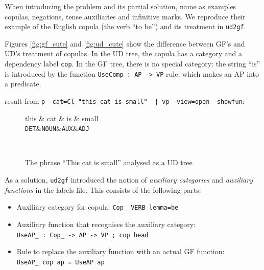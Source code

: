 When introducing the problem and its partial solution, \cite{kolachina-ranta-2017} name as examples copulas, negations, tense auxiliaries and infinitive marks. We reproduce their example of the English copula (the verb ``to be'') and its treatment in \verb|ud2gf|.

Figures \ref{fig:gf_cute} and \ref{fig:ud_cute} show the difference between GF's and UD's treatment of copulas. In the UD tree, the copula has a category and a dependency label \verb|cop|. In the GF tree, there is no special category: the string ``is'' is introduced by the function \verb|UseComp : AP -> VP| rule, which makes an AP into a predicate.


result from \verb+p -cat=Cl "this cat is small"  | vp -view=open -showfun+:


\begin{figure}
    \centering
    \begin{dependency}
       \begin{deptext}[column sep=0.4cm]
             this \& cat \& is \& small \\
           {\tt DET}\&{\tt NOUN}\&{\tt AUX}\&{\tt ADJ}\\
       \end{deptext}
    \end{dependency} \\
    \caption{The phrase ``This cat is small'' analysed as a UD tree}
    \label{fig:enter-label}
\end{figure}

As a solution, \verb|ud2gf| introduced the notion of \emph{auxiliary categories} and \emph{auxiliary functions} in the labels file. This consists of the following parts:
\begin{itemize}
    \item Auxiliary category for copula: \verb|Cop_ VERB lemma=be|
    \item Auxiliary function that recognises the auxiliary category: \\
           \verb|UseAP_ : Cop_ -> AP -> VP ; cop head|
    \item Rule to replace the auxiliary function with an actual GF function: \\
          \verb|UseAP_ cop ap = UseAP ap|
\end{itemize}

